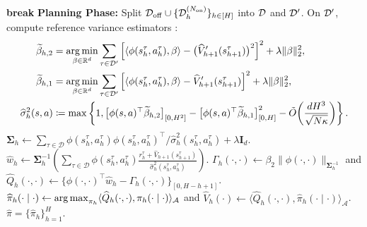 \begin{algorithm}[htbp]
\begin{algorithmic}[1]
             \textbf{break} \EndIf
        \EndFor
        \State \textbf{Planning Phase:} Split ${\mathcal{D}}_{{\operatorname{off}}} \cup \{{\mathcal{D}}^{(N_{{\operatorname{on}}})}_h\}_{h \in [H]}$ into ${\mathcal{D}}$ and ${\mathcal{D}}'$. On ${\mathcal{D}}'$, compute reference variance estimators \citep{xiong2023nearly}:
        \begin{align*}
            \widetilde{\beta}_{h, 2} &= \operatorname*{arg\,min}_{\beta \in \mathbb{R}^d} \sum_{\tau \in \mathcal{D}^{\prime}}\left[\left\langle\phi(s_h^\tau, a_h^\tau), \beta\right\rangle-\big(\widehat{V}_{h+1}^{\prime}(s_{h+1}^\tau)\big)^2\right]^2+\lambda\|\beta\|_2^2, \\
            \widetilde{\beta}_{h, 1} &= \operatorname*{arg\,min}_{\beta \in \mathbb{R}^d} \sum_{\tau \in \mathcal{D}^{\prime}}\left[\left\langle\phi(s_h^\tau, a_h^\tau), \beta\right\rangle-\widehat{V}_{h+1}^{\prime}(s_{h+1}^\tau)\right]^2+\lambda\|\beta\|_2^2, \\
            \widehat{\sigma}_h^2(s, a) &\coloneqq \max \left\{1,\big[\phi(s, a)^{\top} \widetilde{\beta}_{h, 2}\big]_{\left[0, H^2\right]}-\big[\phi(s, a)^{\top} \widetilde{\beta}_{h, 1}\big]_{[0, H]}^2-\tilde{O}\!\left(\frac{d H^3}{\sqrt{N \kappa}}\right)\right\}.
        \end{align*}
            \State $\boldsymbol{\Sigma}_h \leftarrow \sum_{\tau \in \mathcal{D}} \phi(s_h^\tau, a_h^\tau) \phi(s_h^\tau, a_h^\tau)^{\top} / \widehat{\sigma}_h^2(s_h^\tau, a_h^\tau)+\lambda \mathbf{I}_d$.
            \State $\widehat{w}_h \leftarrow \boldsymbol{\Sigma}_h^{-1}\left(\sum_{\tau \in \mathcal{D}} \phi(s_h^\tau, a_h^\tau) \frac{r_h^\tau+\widehat{V}_{h+1}(s_{h+1}^\tau)}{\widehat{\sigma}_h^2(s_h^\tau, a_h^\tau)}\right)$.
            \State $\Gamma_h(\cdot, \cdot) \leftarrow \beta_2\|\phi(\cdot, \cdot)\|_{\boldsymbol{\Sigma}_h^{-1}}$ and $\widehat{Q}_h(\cdot, \cdot) \leftarrow \big\{\phi(\cdot, \cdot)^{\top} \widehat{w}_h-\Gamma_h(\cdot, \cdot)\big\}_{[0, H-h+1]}$.
            \State $\widehat{\pi}_h(\cdot \mid \cdot) \leftarrow \operatorname*{arg\,max}_{\pi_h}\langle\widehat{Q}_h(\cdot, \cdot), \pi_h(\cdot \mid \cdot)\rangle_{\mathcal{A}}$ and $\widehat{V}_h(\cdot) \leftarrow \langle\widehat{Q}_h(\cdot, \cdot), \widehat{\pi}_h(\cdot \mid \cdot)\rangle_{\mathcal{A}}$.
        \EndFor
         $\widehat{\pi} = \{\widehat{\pi}_h\}_{h=1}^H$.
    \end{algorithmic}
\end{algorithm}

